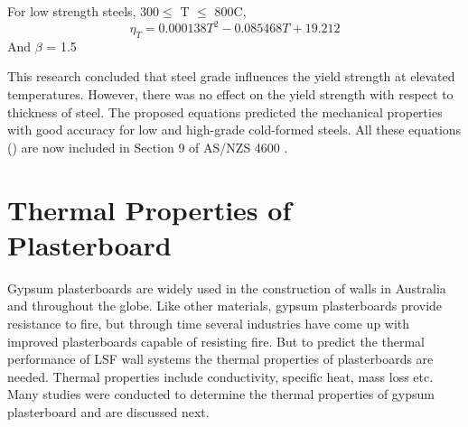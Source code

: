 For low strength steels, 300$ \leq$ T $\leq$ 800\degree C,
\begin{equation}
\eta_T = 0.000138T^2 - 0.085468T + 19.212
\label{eq:yield_high5}
\end{equation}
And
$\beta$ = 1.5

This research concluded that steel grade influences the yield strength at elevated temperatures. However, there was no effect on the yield strength with respect to thickness of steel. The proposed equations predicted the mechanical properties with good accuracy for low and high-grade cold-formed steels. All these equations () are now included in Section 9 of AS/NZS 4600 \citet{ASNZ4600}.

\section{Thermal Properties of Plasterboard}

Gypsum plasterboards are widely used in the construction of walls in Australia and throughout the globe. Like other materials, gypsum plasterboards provide resistance to fire, but through time several industries have come up with improved plasterboards capable of resisting fire. But to predict the thermal performance of LSF wall systems the thermal properties of plasterboards are needed. Thermal properties include conductivity, specific heat, mass loss etc. Many studies were conducted to determine the thermal properties of gypsum plasterboard and are discussed next.

